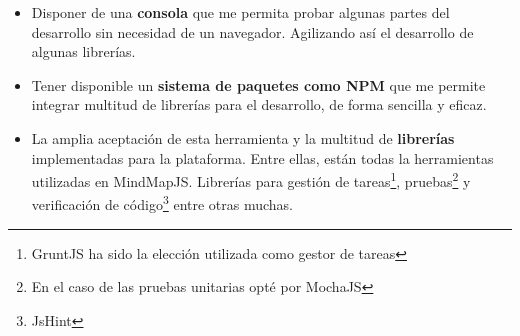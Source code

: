 \begin{itemize}
\item Disponer de una \textbf{consola} que me permita probar algunas partes del desarrollo sin necesidad de un navegador. Agilizando así el desarrollo de algunas librerías.
\item Tener disponible un \textbf{sistema de paquetes como NPM} que me permite integrar multitud de librerías para el desarrollo, de forma sencilla y eficaz. 
\item La amplia aceptación de esta herramienta y la multitud de \textbf{librerías} implementadas para la plataforma. Entre ellas, están todas la herramientas utilizadas en MindMapJS. Librerías para gestión de tareas\footnote{GruntJS ha sido la elección utilizada como gestor de tareas}, pruebas\footnote{En el caso de las pruebas unitarias opté por MochaJS} y verificación de código\footnote{JsHint} entre otras muchas. 
\end{itemize}